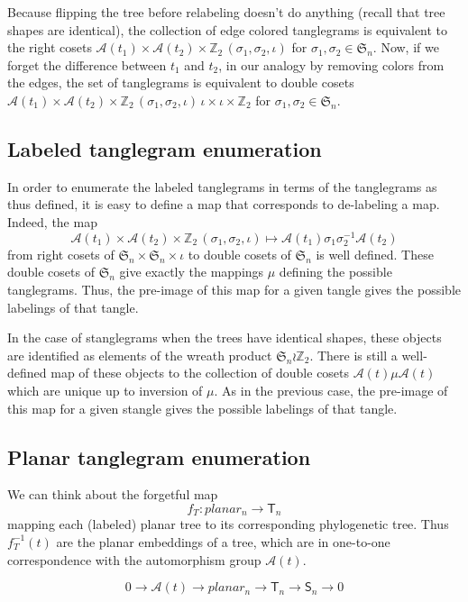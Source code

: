 \documentclass{amsart}
\newcommand{\ZZ}{\mathbb Z}
\newcommand{\fS}{\mathfrak S}
\newcommand{\aut}{\mathcal A}
\newcommand{\pairing}{\mu}
\newcommand{\tree}{\mathsf{T}}
\newcommand{\shape}{\mathsf{S}}
\newcommand{\id}{\iota}
\newcommand{\wrtwo}{\wr \ZZ_2}
\begin{document}
Because flipping the tree before relabeling doesn't do anything (recall that tree shapes are identical), the collection of edge colored tanglegrams is equivalent to the right cosets $\aut(t_1) \times \aut(t_2) \times \ZZ_2 \, (\sigma_1, \sigma_2, \id)$ for $\sigma_1, \sigma_2 \in \fS_n$.
Now, if we forget the difference between $t_1$ and $t_2$, in our analogy by removing colors from the edges, the set of tanglegrams is equivalent to double cosets
$\aut(t_1) \times \aut(t_2) \times \ZZ_2 \, (\sigma_1, \sigma_2, \id) \, {\id} \times {\id} \times \ZZ_2$ for $\sigma_1, \sigma_2 \in \fS_n$.


\subsection{Labeled tanglegram enumeration}
In order to enumerate the labeled tanglegrams in terms of the tanglegrams as thus defined, it is easy to define a map that corresponds to de-labeling a map.
Indeed, the map
\[
\aut(t_1) \times \aut(t_2) \times \ZZ_2 \, (\sigma_1, \sigma_2, \id) \mapsto \aut(t_1) \sigma_1 \sigma_2^{-1} \aut(t_2)
\]
from right cosets of $\fS_n \times \fS_n \times \id$ to double cosets of $\fS_n$ is well defined.
These double cosets of $\fS_n$ give exactly the mappings $\pairing$ defining the possible tanglegrams.
Thus, the pre-image of this map for a given tangle gives the possible labelings of that tangle.

In the case of stanglegrams when the trees have identical shapes, these objects are identified as elements of the wreath product $\fS_n \wrtwo$.
There is still a well-defined map of these objects to the collection of double cosets $\aut(t) \pairing \aut(t)$ which are unique up to inversion of $\pairing$.
As in the previous case, the pre-image of this map for a given stangle gives the possible labelings of that tangle.


\subsection{Planar tanglegram enumeration}

We can think about the forgetful map
\[
f_T: planar_n \rightarrow \tree_n
\]
mapping each (labeled) planar tree to its corresponding phylogenetic tree.
Thus $f_T^{-1}(t)$ are the planar embeddings of a tree, which are in one-to-one correspondence with the automorphism group $\aut(t)$.

\[
0 \rightarrow \aut(t) \rightarrow planar_n \rightarrow \tree_n \rightarrow \shape_n \rightarrow 0
\]
\end{document}
